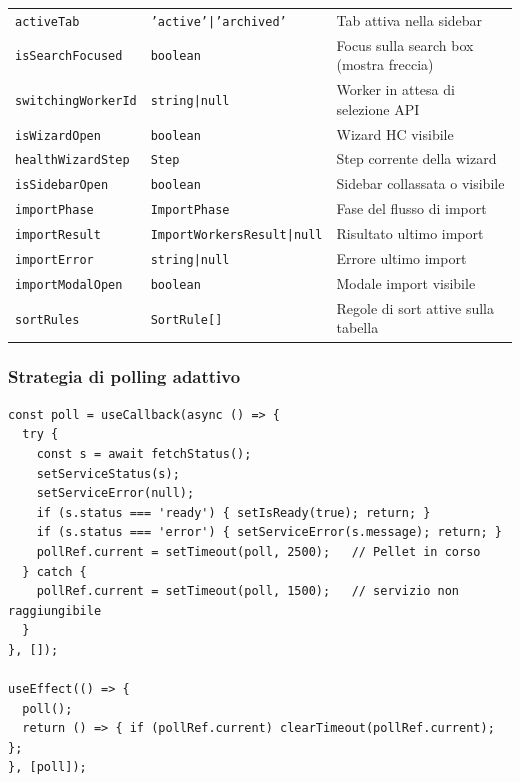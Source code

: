 \documentclass[a4paper,12pt]{article}
\begin{document}
\begin{table}[H]
\begin{tabular}{L{4.8cm} L{3.5cm} L{4.7cm}}
\texttt{activeTab} & {\footnotesize\texttt{'active'|'archived'}} & Tab attiva nella sidebar \\
\texttt{isSearchFocused} & \texttt{boolean} & Focus sulla search box (mostra freccia) \\
\texttt{switchingWorkerId} & \texttt{string|null} & Worker in attesa di selezione API \\
\texttt{isWizardOpen} & \texttt{boolean} & Wizard HC visibile \\
\texttt{healthWizardStep} & \texttt{Step} & Step corrente della wizard \\
\texttt{isSidebarOpen} & \texttt{boolean} & Sidebar collassata o visibile \\
\texttt{importPhase} & \texttt{ImportPhase} & Fase del flusso di import \\
\texttt{importResult} & {\tiny\texttt{ImportWorkersResult|null}} & Risultato ultimo import \\
\texttt{importError} & \texttt{string|null} & Errore ultimo import \\
\texttt{importModalOpen} & \texttt{boolean} & Modale import visibile \\
\texttt{sortRules} & \texttt{SortRule[]} & Regole di sort attive sulla tabella \\
\bottomrule
\end{tabular}
\end{table}

\subsubsection{Strategia di polling adattivo}
\vspace{2pt}
\begin{lstlisting}
const poll = useCallback(async () => {
  try {
    const s = await fetchStatus();
    setServiceStatus(s);
    setServiceError(null);
    if (s.status === 'ready') { setIsReady(true); return; }
    if (s.status === 'error') { setServiceError(s.message); return; }
    pollRef.current = setTimeout(poll, 2500);   // Pellet in corso
  } catch {
    pollRef.current = setTimeout(poll, 1500);   // servizio non raggiungibile
  }
}, []);

useEffect(() => {
  poll();
  return () => { if (pollRef.current) clearTimeout(pollRef.current); };
}, [poll]);
\end{lstlisting}
\end{document}
